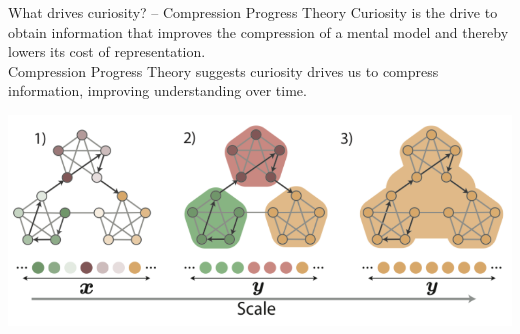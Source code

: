 \documentclass{beamer}
\begin{document}

\begin{frame}{What drives curiosity? -- Compression Progress Theory}
	Curiosity is the drive to obtain information that improves the compression of a mental model and thereby lowers its cost of representation.\\
	Compression Progress Theory suggests curiosity drives us to compress information, improving understanding over time.
	
\begin{center} \includegraphics[scale=.5]{scale.png}\end{center}
\end{frame}
\end{document}
